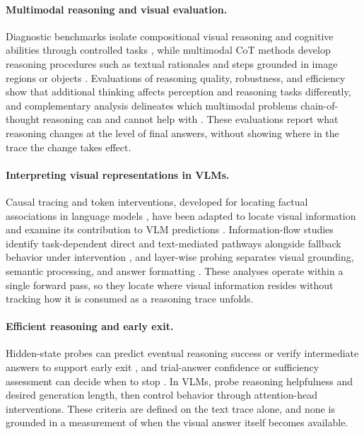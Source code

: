\documentclass{article} %
\begin{document}
\paragraph{Multimodal reasoning and visual evaluation.}
Diagnostic benchmarks isolate compositional visual reasoning and cognitive abilities through controlled tasks \citep{johnson2017clevr,schiappa2024probing,huang2025visfactor}, while multimodal CoT methods develop reasoning procedures such as textual rationales and steps grounded in image regions or objects \citep{zhang2024multimodalcot,shao2024visualcot,li2025vocot}. Evaluations of reasoning quality, robustness, and efficiency show that additional thinking affects perception and reasoning tasks differently, and complementary analysis delineates which multimodal problems chain-of-thought reasoning can and cannot help with \citep{jiang2025mmecot,jin2026looklight}. These evaluations report what reasoning changes at the level of final answers, without showing where in the trace the change takes effect.

\paragraph{Interpreting visual representations in VLMs.}
Causal tracing and token interventions, developed for locating factual associations in language models \citep{meng2022locating}, have been adapted to locate visual information and examine its contribution to VLM predictions \citep{basu2024understanding,neo2025interpreting}. Information-flow studies identify task-dependent direct and text-mediated pathways alongside fallback behavior under intervention \citep{zhang2025crossmodal,salazar2026pathways}, and layer-wise probing separates visual grounding, semantic processing, and answer formatting \citep{yu2025multimodal}. These analyses operate within a single forward pass, so they locate where visual information resides without tracking how it is consumed as a reasoning trace unfolds.

\paragraph{Efficient reasoning and early exit.}
Hidden-state probes can predict eventual reasoning success or verify intermediate answers to support early exit \citep{afzal2025knowing,zhang2025reasoningmodels}, and trial-answer confidence or sufficiency assessment can decide when to stop \citep{yang2026deer,xiang2026thinking}. In VLMs, \citet{bi2026seeing} probe reasoning helpfulness and desired generation length, then control behavior through attention-head interventions. These criteria are defined on the text trace alone, and none is grounded in a measurement of when the visual answer itself becomes available.
\end{document}
